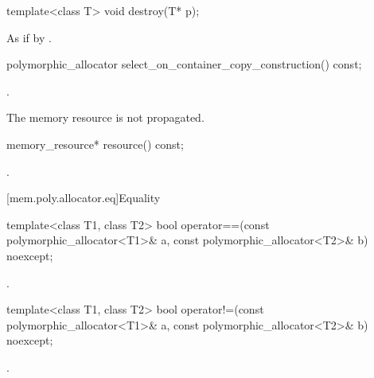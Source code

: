 %
\begin{itemdecl}
template<class T>
  void destroy(T* p);
\end{itemdecl}

\begin{itemdescr}
\pnum
\effects
As if by .
\end{itemdescr}

%
\begin{itemdecl}
polymorphic_allocator select_on_container_copy_construction() const;
\end{itemdecl}

\begin{itemdescr}
\pnum
\returns
{}.

\pnum
\begin{note}
The memory resource is not propagated.
\end{note}
\end{itemdescr}

%
\begin{itemdecl}
memory_resource* resource() const;
\end{itemdecl}

\begin{itemdescr}
\pnum
\returns
{}.
\end{itemdescr}

[mem.poly.allocator.eq]{Equality}

%
\begin{itemdecl}
template<class T1, class T2>
  bool operator==(const polymorphic_allocator<T1>& a,
                  const polymorphic_allocator<T2>& b) noexcept;
\end{itemdecl}

\begin{itemdescr}
\pnum
\returns
{}.
\end{itemdescr}

%
\begin{itemdecl}
template<class T1, class T2>
  bool operator!=(const polymorphic_allocator<T1>& a,
                  const polymorphic_allocator<T2>& b) noexcept;
\end{itemdecl}

\begin{itemdescr}
\pnum
\returns
{}.
\end{itemdescr}


